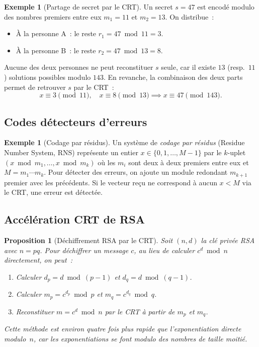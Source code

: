 \documentclass[12pt,a4paper,openany]{book}
\theoremstyle{definition}
\newtheorem{exemple}[definition]{Exemple}
\theoremstyle{plain}
\newtheorem{proposition}[definition]{Proposition}
\theoremstyle{remark}
\begin{document}
\begin{exemple}[Partage de secret par le CRT]
\label{ex:crt-secret}
Un secret $s = 47$ est encodé modulo des nombres premiers entre eux $m_1 = 11$
et $m_2 = 13$. On distribue~:
\begin{itemize}
  \item À la personne A~: le reste $r_1 = 47 \bmod 11 = 3$.
  \item À la personne B~: le reste $r_2 = 47 \bmod 13 = 8$.
\end{itemize}
Aucune des deux personnes ne peut reconstituer $s$ seule, car il existe $13$
(resp.\ $11$) solutions possibles modulo $143$. En revanche, la combinaison
des deux parts permet de retrouver $s$ par le CRT~:
\[
  x \equiv 3 \pmod{11}, \quad x \equiv 8 \pmod{13}
  \implies x \equiv 47 \pmod{143}.
\]
\end{exemple}

\subsection{Codes détecteurs d'erreurs}
\label{subsec:crt:codes}

\begin{exemple}[Codage par résidus]
\label{ex:crt-codes}
Un système de \emph{codage par résidus} (Residue Number
System, RNS) représente un entier $x \in \{0, 1, \ldots, M-1\}$ par le $k$-uplet
$(x \bmod m_1, \ldots, x \bmod m_k)$ où les $m_i$ sont deux à deux premiers entre eux
et $M = m_1 \cdots m_k$. Pour détecter des erreurs, on ajoute un module redondant
$m_{k+1}$ premier avec les précédents. Si le vecteur reçu ne correspond à aucun
$x < M$ via le CRT, une erreur est détectée.
\end{exemple}

\subsection{Accélération CRT de RSA}
\label{subsec:crt:rsa}

\begin{proposition}[Déchiffrement RSA par le CRT]
\label{prop:rsa-crt}
Soit $(n, d)$ la clé privée RSA avec $n = pq$. Pour déchiffrer un message $c$,
au lieu de calculer $c^d \bmod n$ directement, on peut~:
\begin{enumerate}[label=(\roman*)]
  \item Calculer $d_p = d \bmod (p-1)$ et $d_q = d \bmod (q-1)$.
  \item Calculer $m_p = c^{d_p} \bmod p$ et $m_q = c^{d_q} \bmod q$.
  \item Reconstituer $m = c^d \bmod n$ par le CRT à partir de $m_p$ et $m_q$.
\end{enumerate}
Cette méthode est environ \emph{quatre fois plus rapide} que l'exponentiation
directe modulo~$n$, car les exponentiations se font modulo des nombres de taille moitié.
\end{proposition}
\end{document}
